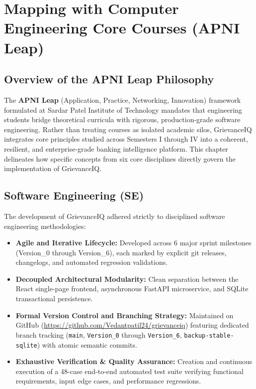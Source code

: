 \chapter{Mapping with Computer Engineering Core Courses (APNI Leap)}

\section{Overview of the APNI Leap Philosophy}
The \textbf{APNI Leap} (Application, Practice, Networking, Innovation) framework formulated at Sardar Patel Institute of Technology mandates that engineering students bridge theoretical curricula with rigorous, production-grade software engineering. Rather than treating courses as isolated academic silos, GrievanceIQ integrates core principles studied across Semesters I through IV into a coherent, resilient, and enterprise-grade banking intelligence platform. This chapter delineates how specific concepts from six core disciplines directly govern the implementation of GrievanceIQ.

\section{Software Engineering (SE)}
The development of GrievanceIQ adhered strictly to disciplined software engineering methodologies:
\begin{itemize}
    \item \textbf{Agile and Iterative Lifecycle:} Developed across 6 major sprint milestones (Version\_0 through Version\_6), each marked by explicit git releases, changelogs, and automated regression validations.
    \item \textbf{Decoupled Architectural Modularity:} Clean separation between the React single-page frontend, asynchronous FastAPI microservice, and SQLite transactional persistence.
    \item \textbf{Formal Version Control and Branching Strategy:} Maintained on GitHub (\url{https://github.com/Vedantpatil24/grievanceiq}) featuring dedicated branch tracking (\texttt{main}, \texttt{Version\_0} through \texttt{Version\_6}, \texttt{backup-stable-sqlite}) with atomic semantic commits.
    \item \textbf{Exhaustive Verification \& Quality Assurance:} Creation and continuous execution of a 48-case end-to-end automated test suite verifying functional requirements, input edge cases, and performance regressions.
\end{itemize}

